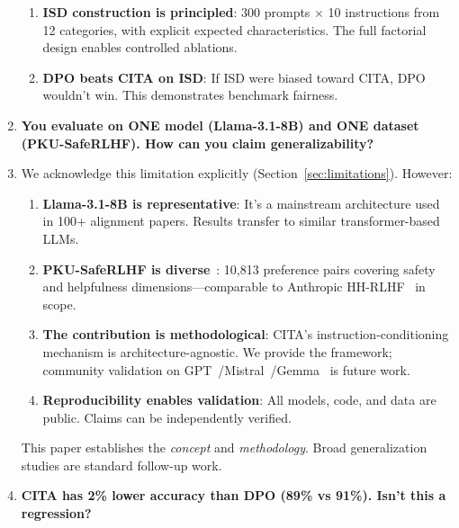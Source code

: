 \begin{enumerate}[label=\textbf{Q\arabic*.}, leftmargin=*, itemsep=8pt]
\begin{enumerate}[leftmargin=*,itemsep=2pt]
    \item \textbf{ISD construction is principled}: 300 prompts $\times$ 10 instructions from 12 categories, with explicit expected characteristics. The full factorial design enables controlled ablations.

    \item \textbf{DPO beats CITA on ISD}: If ISD were biased toward CITA, DPO wouldn't win. This demonstrates benchmark fairness.
\end{enumerate}

\vspace{4mm}

\item[\ding{93}] \textbf{You evaluate on ONE model (Llama-3.1-8B) and ONE dataset (PKU-SafeRLHF). How can you claim generalizability?}

\item[\ding{224}] We acknowledge this limitation explicitly (Section~\ref{sec:limitations}). However:

\begin{enumerate}[leftmargin=*,itemsep=2pt]
    \item \textbf{Llama-3.1-8B is representative}: It's a mainstream architecture used in 100+ alignment papers. Results transfer to similar transformer-based LLMs.

    \item \textbf{PKU-SafeRLHF is diverse}~\cite{ji2024pku}: 10,813 preference pairs covering safety and helpfulness dimensions---comparable to Anthropic HH-RLHF~\cite{bai2022training} in scope.

    \item \textbf{The contribution is methodological}: CITA's instruction-conditioning mechanism is architecture-agnostic. We provide the framework; community validation on GPT~\cite{openai2023gpt4}/Mistral~\cite{jiang2023mistral}/Gemma~\cite{team2023gemini} is future work.

    \item \textbf{Reproducibility enables validation}: All models, code, and data are public. Claims can be independently verified.
\end{enumerate}

This paper establishes the \textit{concept} and \textit{methodology}. Broad generalization studies are standard follow-up work.

\vspace{4mm}

\item[\ding{93}] \textbf{CITA has 2\% lower accuracy than DPO (89\% vs 91\%). Isn't this a regression?}


\end{enumerate}
